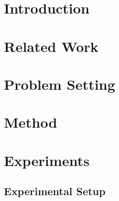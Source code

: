 \begin{abstract}
\end{abstract}

\section{Introduction}\label{sec:introduction}

\section{Related Work}\label{sec:related}

\section{Problem Setting}\label{sec:setting}

\section{Method}\label{sec:method}

\section{Experiments}\label{sec:experiments}
\subsection{Experimental Setup}\label{sec:setup}
